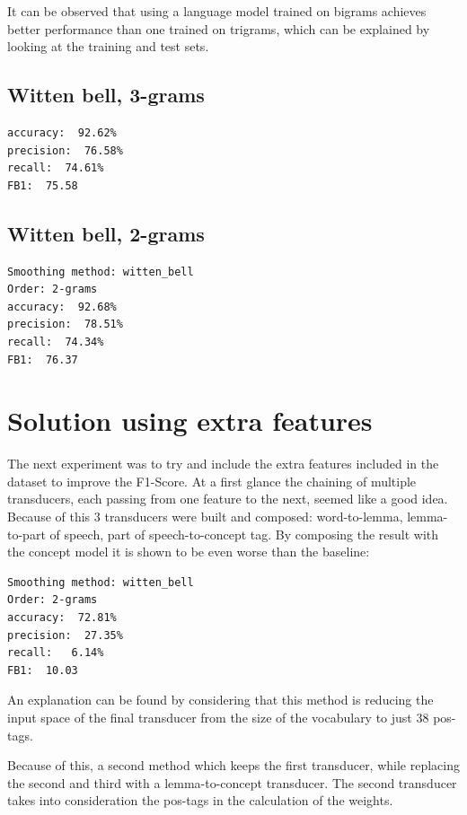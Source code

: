 \documentclass[11pt,a4paper]{article}
\begin{document}
It can be observed that using a language model trained on bigrams achieves better performance than one trained on trigrams, which can be explained by looking at the training and test sets.

\subsection{Witten bell, 3-grams}
\begin{verbatim}
accuracy:  92.62%
precision:  76.58%
recall:  74.61%
FB1:  75.58
\end{verbatim}

\subsection{Witten bell, 2-grams}
\begin{verbatim}
Smoothing method: witten_bell
Order: 2-grams
accuracy:  92.68%
precision:  78.51%
recall:  74.34%
FB1:  76.37
\end{verbatim}

\section{Solution using extra features}

The next experiment was to try and include the extra features included in the dataset to improve the F1-Score.
At a first glance the chaining of multiple transducers, each passing from one feature to the next, seemed like a good idea.
Because of this 3 transducers were built and composed: word-to-lemma, lemma-to-part of speech, part of speech-to-concept tag.
By composing the result with the concept model it is shown to be even worse than the baseline:

\begin{verbatim}
Smoothing method: witten_bell
Order: 2-grams
accuracy:  72.81%
precision:  27.35%
recall:   6.14%
FB1:  10.03
\end{verbatim}

An explanation can be found by considering that this method is reducing the input space of the final transducer from the size of the vocabulary to just 38 pos-tags.

Because of this, a second method which keeps the first transducer, while replacing the second and third with a lemma-to-concept transducer.
The second transducer takes into consideration the pos-tags in the calculation of the weights.
\end{document}
